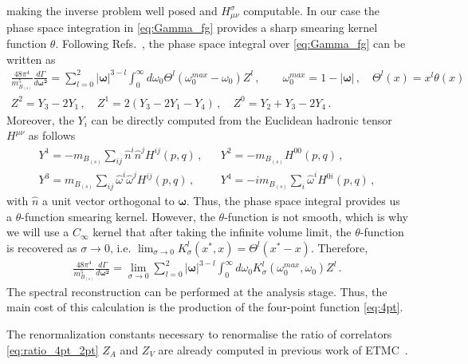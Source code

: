 making the inverse problem well posed and $H^\sigma_{\mu\nu}$ computable.
In our case the phase space integration in \eqref{eq:Gamma_fg}
provides a sharp smearing kernel function $\theta$. Following
Refs.~\cite{Gambino:2020crt, Gambino:2022dvu}, the phase space integral over
\eqref{eq:Gamma_fg} can be written as
\begin{gather}
  \frac{48 \pi^4}{m_{B_{(s)}}^5}\frac{d\Gamma}{d \bm{ \omega^2} }
  =\sum_{l=0}^2 |\bm{\omega}|^{3-l}\int_0^{\infty}d \omega_0 \Theta^l(\omega_0^{max}-\omega_0) Z^l\,,\quad\quad {\omega}_0^{max}=1-|\bm{\omega}|\,,\quad\Theta^l(x)=x^l\theta(x)\\
  Z^2=Y_3-2Y_1\,,\quad Z^1=2(Y_3-2Y_1-Y_4)\,,\quad Z^0=Y_2+Y_3-2Y_4\,.
\end{gather}
Moreover, the $Y_i$ can be directly computed from the Euclidean
hadronic tensor $H^{\mu\nu}$ as follows
\begin{align}
                                                     & Y^1=-m_{B_{(s)}}\sum_{ij}\hat{n}^i\hat{n}^j H^{ij}(p,q)\,,          &  & Y^2=-m_{B_{(s)}}H^{00}(p,q)\,, \\
                                                     & Y^3=m_{B_{(s)}}\sum_{ij}\hat{\omega}^i\hat{\omega}^j H^{ij}(p,q)\,, &  &
  Y^4=-im_{B_{(s)}}\sum_{i}\hat{\omega}^i H^{0i}(p,q)\,, &
\end{align}
with $\hat{n}$ a unit vector orthogonal to $\bm\omega$.
Thus, the phase space integral provides us a $\theta$-function smearing
kernel. However, the $\theta$-function is not smooth, which is why we
will use a $C_\infty$ kernel that
after taking the infinite volume limit, the
$\theta$-function is recovered as $\sigma\to0$, i.e. $\lim_{\sigma\to 0} K_\sigma^l(x^*,x)=\Theta^l(x^*-x)$.
Therefore,
\begin{gather}
  \frac{48 \pi^4}{m_{B_{(s)}}^5}\frac{d\Gamma}{d \bm{ \omega^2} }
  =\lim_{\sigma\to 0}\sum_{l=0}^2 |\bm{\omega}|^{3-l}\int_0^{\infty}d \omega_0 K_\sigma^l(\omega_0^{max},\omega_0) Z^l\,.
\end{gather}
The spectral reconstruction can be performed at the analysis stage. Thus,
the main cost of this calculation is the production of the
four-point function \eqref{eq:4pt}.

The renormalization constants necessary to renormalise the ratio of
correlators \eqref{eq:ratio_4pt_2pt} $Z_A$ and $Z_V$ are already
computed in previous work of ETMC~\cite{ExtendedTwistedMass:2024myu}.

